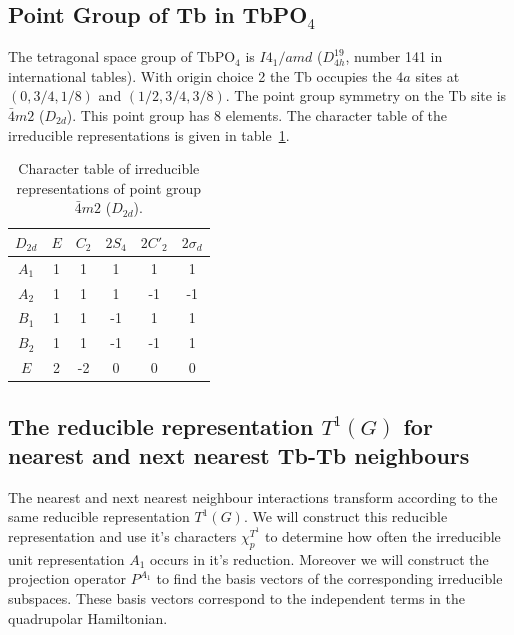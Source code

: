 \subsection{Point Group of Tb in TbPO$_4$}

The tetragonal space group of TbPO$_4$ is $I 4_1/amd$ ($D_{4h}^{19}$, number 141 in international 
tables). With origin choice 2 the Tb occupies the $4a$ sites at $(0,3/4,1/8)$ and
$(1/2,3/4,3/8)$. The point group symmetry on the Tb site is 
 $\bar 4 m 2 $ ($D_{2d}$). This point group has 8 elements. The character table
of the irreducible representations is given in table~\ref{char}.

\begin{table}
\caption{Character table of irreducible representations of point group $\bar 4 m 2 $ ($D_{2d}$).}
\label{char}\begin{tabular}{c|ccccc}
$D_{2d}$ & $E$ & $C_2$ & $2S_4$ & $ 2C'_2$ & $2\sigma_d$ \\
\hline
$A_1$    &  1  & 1     & 1      & 1        &   1   \\
$A_2$    &  1  & 1     & 1      & -1        &   -1   \\
$B_1$    &  1  & 1     & -1      & 1        &   1   \\
$B_2$    &  1  & 1     & -1      & -1        &   1   \\
$E$      &  2  & -2    & 0       & 0         &   0 \\
\end{tabular}
\end{table}







\subsection{The reducible representation $T^1(G)$ for nearest  and next nearest Tb-Tb neighbours}

The nearest and next nearest neighbour interactions transform according to the
same reducible representation $T^1(G)$. We will construct this reducible representation 
and use it's characters $\chi_p^{T^1}$ to determine how often the irreducible unit representation
$A_1$ occurs in it's reduction. Moreover we will construct the projection operator
$P^{A_1}$ to find the basis vectors of the corresponding irreducible subspaces. 
These basis vectors correspond to the independent terms in the quadrupolar Hamiltonian.

